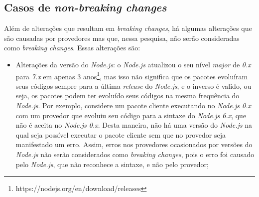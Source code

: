\subsection{Casos de \textit{non-breaking changes}}
Além de alterações que resultam em \textit{breaking changes}, há algumas alterações que são causadas por provedores mas que, nessa pesquisa, não serão consideradas como \textit{breaking changes}. Essas alterações são:

\begin{itemize}
    \item Alterações da versão do \textit{Node.js}: o \textit{Node.js} atualizou o seu nível \textit{major} de \textit{0.x} para \textit{7.x} em apenas 3 anos\footnote{https://nodejs.org/en/download/releases}, mas isso não significa que os pacotes evoluíram seus códigos sempre para a última \textit{release} do \textit{Node.js}, e o inverso é valido, ou seja, os pacotes podem ter evoluído seus códigos na mesma frequência do \textit{Node.js}. Por exemplo, considere um pacote cliente executando no \textit{Node.js 0.x} com um provedor que evoluiu seu código para a sintaxe do \textit{Node.js 6.x}, que não é aceita no \textit{Node.js 0.x}. Desta maneira, não há uma versão do \textit{Node.js}  na qual seja possível executar o pacote cliente sem que no provedor seja manifestado um erro. Assim, erros nos provedores ocasionados por versões do \textit{Node.js} não serão considerados como \textit{breaking changes}, pois o erro foi causado pelo \textit{Node.js}, que não reconhece a sintaxe, e não pelo provedor;


\end{itemize}
